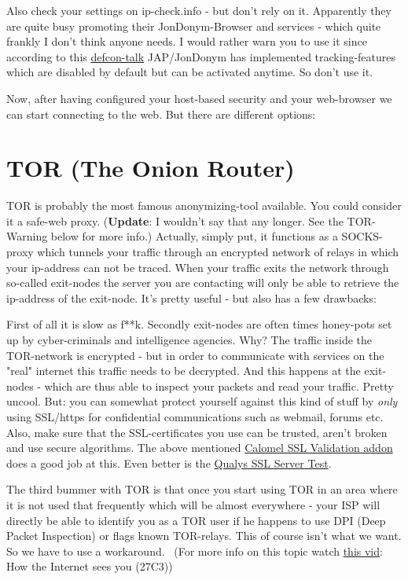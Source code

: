 \documentclass{article}
\begin{document}
 Also check your settings on ip-check.info - but don't rely on it. Apparently they are quite busy promoting their JonDonym-Browser and services - which quite frankly I don't think anyone needs. I would rather warn you to use it since according to this \href{http://youtu.be/_DMvx86ySss}{defcon-talk} JAP/JonDonym has implemented tracking-features which are disabled by default but can be activated anytime. So don't use it. 


 Now, after having configured your host-based security and your web-browser we can start connecting to the web. But there are different options:
\section{TOR (The Onion Router)}


 TOR is probably the most famous anonymizing-tool available. You could consider it a safe-web proxy. (\textbf{Update}: I wouldn't say that any longer. See the TOR-Warning below for more info.) Actually, simply put, it functions as a SOCKS-proxy which tunnels your traffic through an encrypted network of relays in which your ip-address can not be traced. When your traffic exits the network through so-called exit-nodes the server you are contacting will only be able to retrieve the ip-address of the exit-node. It's pretty useful - but also has a few drawbacks:


 First of all it is slow as f**k. Secondly exit-nodes are often times honey-pots set up by cyber-criminals and intelligence agencies. Why? The traffic inside the TOR-network is encrypted - but in order to communicate with services on the "real" internet this traffic needs to be decrypted. And this happens at the exit-nodes - which are thus able to inspect your packets and read your traffic. Pretty uncool. But: you can somewhat protect yourself against this kind of stuff by \emph{only} using SSL/https for confidential communications such as webmail, forums etc. Also, make sure that the SSL-certificates you use can be trusted, aren't broken and use secure algorithms. The above mentioned \href{https://addons.mozilla.org/en-US/firefox/addon/calomel-ssl-validation/}{Calomel SSL Validation addon} does a good job at this. Even better is the \href{https://www.ssllabs.com/ssltest/index.html}{Qualys SSL Server Test}.


 The third bummer with TOR is that once you start using TOR in an area where it is not used that frequently which will be almost everywhere - your ISP will directly be able to identify you as a TOR user if he happens to use DPI (Deep Packet Inspection) or flags known TOR-relays. This of course isn't what we want. So we have to use a workaround.~ (For more info on this topic watch \href{https://www.youtube.com/watch?v=W9l9Pk3yBNs}{this vid}: How the Internet sees you (27C3))
\end{document}
